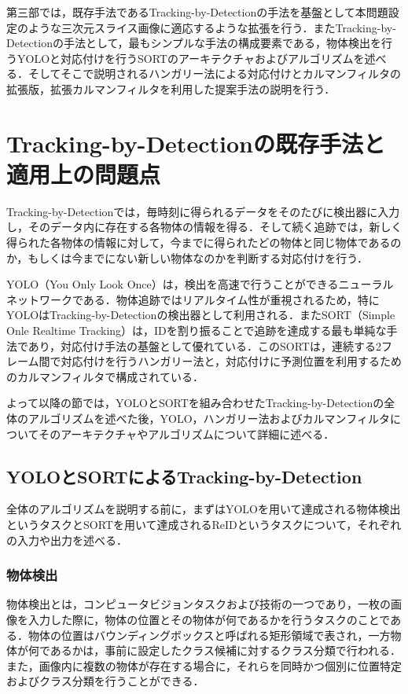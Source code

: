 \thispagestyle{fancy2}

第三部では，既存手法であるTracking-by-Detectionの手法を基盤として本問題設定のような三次元スライス画像に適応するような拡張を行う．またTracking-by-Detectionの手法として，最もシンプルな手法の構成要素である，物体検出を行うYOLOと対応付けを行うSORTのアーキテクチャおよびアルゴリズムを述べる．そしてそこで説明されるハンガリー法による対応付けとカルマンフィルタの拡張版，拡張カルマンフィルタを利用した提案手法の説明を行う．

\section{Tracking-by-Detectionの既存手法と適用上の問題点}
\label{sec:existing_method}

Tracking-by-Detectionでは，毎時刻に得られるデータをそのたびに検出器に入力し，そのデータ内に存在する各物体の情報を得る．そして続く追跡では，新しく得られた各物体の情報に対して，今までに得られたどの物体と同じ物体であるのか，もしくは今までにない新しい物体なのかを判断する対応付けを行う．

YOLO（You Only Look Once）\cite{redmon2016you, alif2024yolov1}は，検出を高速で行うことができるニューラルネットワークである．物体追跡ではリアルタイム性が重視されるため，特にYOLOはTracking-by-Detectionの検出器として利用される．またSORT（Simple Onle Realtime Tracking）\cite{bewley2016simple,wojke2017simple,du2023strongsort}は，IDを割り振ることで追跡を達成する最も単純な手法であり，対応付け手法の基盤として優れている．このSORTは，連続する2フレーム間で対応付けを行うハンガリー法\cite{kuhn1955hungarian}と，対応付けに予測位置を利用するためのカルマンフィルタ\cite{bishop2001introduction}で構成されている．

よって以降の節では，YOLOとSORTを組み合わせたTracking-by-Detectionの全体のアルゴリズムを述べた後，YOLO，ハンガリー法およびカルマンフィルタについてそのアーキテクチャやアルゴリズムについて詳細に述べる．

    \subsection{YOLOとSORTによるTracking-by-Detection}
    \label{subsec:yolo_and_sort}
    
    全体のアルゴリズムを説明する前に，まずはYOLOを用いて達成される物体検出というタスクとSORTを用いて達成されるReIDというタスクについて，それぞれの入力や出力を述べる．

        \subsubsection{物体検出}
        物体検出とは，コンピュータビジョンタスクおよび技術の一つであり，一枚の画像を入力した際に，物体の位置とその物体が何であるかを行うタスクのことである．物体の位置はバウンディングボックスと呼ばれる矩形領域で表され，一方物体が何であるかは，事前に設定したクラス候補に対するクラス分類で行われる．また，画像内に複数の物体が存在する場合に，それらを同時かつ個別に位置特定およびクラス分類を行うことができる．

